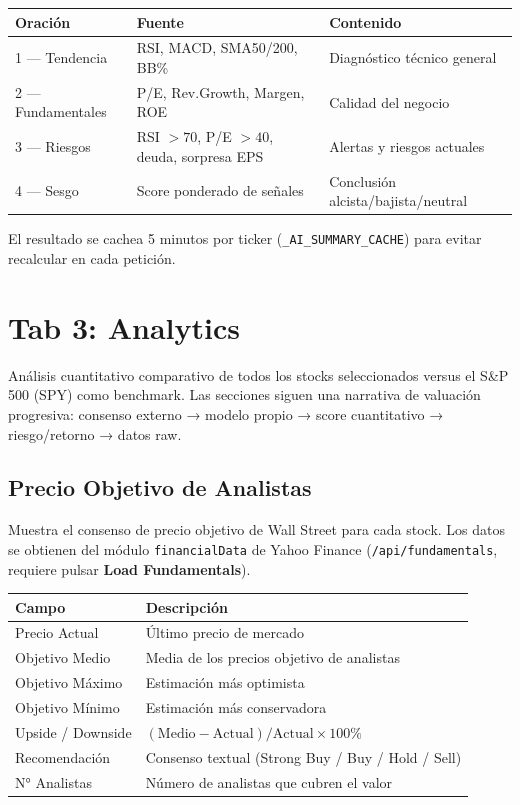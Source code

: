 \documentclass[11pt, a4paper]{article}
\newcommand{\code}[1]{\texttt{#1}}
\begin{document}
\begin{center}
\begin{tabularx}{\textwidth}{llX}
  \toprule
  \textbf{Oración} & \textbf{Fuente} & \textbf{Contenido} \\
  \midrule
  1 — Tendencia  & RSI, MACD, SMA50/200, BB\%  & Diagnóstico técnico general \\
  2 — Fundamentales & P/E, Rev.Growth, Margen, ROE & Calidad del negocio \\
  3 — Riesgos    & RSI $>70$, P/E $>40$, deuda, sorpresa EPS & Alertas y riesgos actuales \\
  4 — Sesgo      & Score ponderado de señales & Conclusión alcista/bajista/neutral \\
  \bottomrule
\end{tabularx}
\end{center}

El resultado se cachea 5 minutos por ticker (\code{\_AI\_SUMMARY\_CACHE}) para evitar recalcular en cada petición.

\newpage

\section{Tab 3: Analytics}

Análisis cuantitativo comparativo de todos los stocks seleccionados versus el S\&P 500 (SPY) como benchmark. Las secciones siguen una narrativa de valuación progresiva: consenso externo → modelo propio → score cuantitativo → riesgo/retorno → datos raw.

\subsection{Precio Objetivo de Analistas}

Muestra el consenso de precio objetivo de Wall Street para cada stock. Los datos se obtienen del módulo \code{financialData} de Yahoo Finance (\code{/api/fundamentals}, requiere pulsar \textbf{Load Fundamentals}).

\begin{center}
\begin{tabular}{ll}
  \toprule
  \textbf{Campo} & \textbf{Descripción} \\
  \midrule
  Precio Actual       & Último precio de mercado \\
  Objetivo Medio      & Media de los precios objetivo de analistas \\
  Objetivo Máximo     & Estimación más optimista \\
  Objetivo Mínimo     & Estimación más conservadora \\
  Upside / Downside   & $(\text{Medio} - \text{Actual}) / \text{Actual} \times 100\%$ \\
  Recomendación       & Consenso textual (Strong Buy / Buy / Hold / Sell) \\
  N° Analistas        & Número de analistas que cubren el valor \\
  \bottomrule
\end{tabular}
\end{center}
\end{document}
